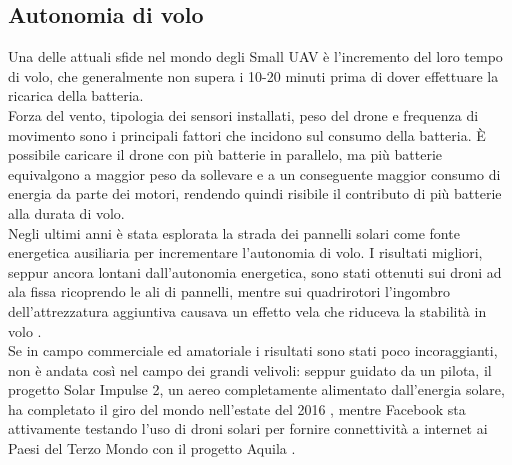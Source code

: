 \subsection[Autonomia di volo]{Autonomia di volo} \label{sect:autonomia}
Una delle attuali sfide nel mondo degli Small UAV è l'incremento del loro tempo di volo, che generalmente non supera i 10-20 minuti prima di dover effettuare la ricarica della batteria. \\
Forza del vento, tipologia dei sensori installati, peso del drone e frequenza di movimento sono i principali fattori che incidono sul consumo della batteria. 
È possibile caricare il drone con più batterie in parallelo, ma più batterie equivalgono a maggior peso da sollevare e a un conseguente maggior consumo di energia da parte dei motori, rendendo quindi risibile il contributo di più batterie alla durata di volo.\\
Negli ultimi anni è stata esplorata la strada dei pannelli solari come fonte energetica ausiliaria per incrementare l'autonomia di volo. 
I risultati migliori, seppur ancora lontani dall'autonomia energetica, sono stati ottenuti sui droni ad ala fissa \cite{newatlas} ricoprendo le ali di pannelli, mentre sui quadrirotori l'ingombro dell'attrezzatura aggiuntiva causava un effetto vela che riduceva la stabilità in volo \cite{diydrones}.\\ Se in campo commerciale ed amatoriale i risultati sono stati poco incoraggianti, non è andata così nel campo dei grandi velivoli: seppur guidato da un pilota, il progetto Solar Impulse 2, un aereo completamente alimentato dall'energia solare, ha completato il giro del mondo nell'estate del 2016 \cite{theguardian}, mentre Facebook sta attivamente testando l'uso di droni solari per fornire connettività a internet ai Paesi del Terzo Mondo con il progetto Aquila \cite{fbaquila}.\\


